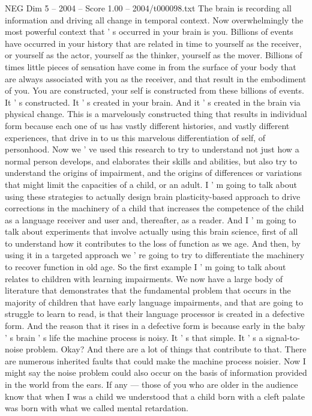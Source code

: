 \begin{textsample}{NEG Dim 5 – 2004 – Score 1.00 – 2004/t000098.txt}
The brain is recording all information and driving all change in temporal context.
Now overwhelmingly the most powerful context that ' s occurred in your brain is you.
Billions of events have occurred in your history that are related in time to yourself as the receiver, or yourself as the actor, yourself as the thinker, yourself as the mover.
Billions of times little pieces of sensation have come in from the surface of your body that are always associated with you as the receiver, and that result in the embodiment of you.
You are constructed, your self is constructed from these billions of events.
It ' s constructed.
It ' s created in your brain.
And it ' s created in the brain via physical change.
This is a marvelously constructed thing that results in individual form because each one of us has vastly different histories, and vastly different experiences, that drive in to us this marvelous differentiation of self, of personhood.
Now we ' ve used this research to try to understand not just how a normal person develops, and elaborates their skills and abilities, but also try to understand the origins of impairment, and the origins of differences or variations that might limit the capacities of a child, or an adult.
I ' m going to talk about using these strategies to actually design brain plasticity-based approach to drive corrections in the machinery of a child that increases the competence of the child as a language receiver and user and, thereafter, as a reader.
And I ' m going to talk about experiments that involve actually using this brain science, first of all to understand how it contributes to the loss of function as we age.
And then, by using it in a targeted approach we ' re going to try to differentiate the machinery to recover function in old age.
So the first example I ' m going to talk about relates to children with learning impairments.
We now have a large body of literature that demonstrates that the fundamental problem that occurs in the majority of children that have early language impairments, and that are going to struggle to learn to read, is that their language processor is created in a defective form.
And the reason that it rises in a defective form is because early in the baby ' s brain ' s life the machine process is noisy.
It ' s that simple.
It ' s a signal-to-noise problem.
Okay?
And there are a lot of things that contribute to that.
There are numerous inherited faults that could make the machine process noisier.
Now I might say the noise problem could also occur on the basis of information provided in the world from the ears.
If any — those of you who are older in the audience know that when I was a child we understood that a child born with a cleft palate was born with what we called mental retardation.

\end{textsample}
